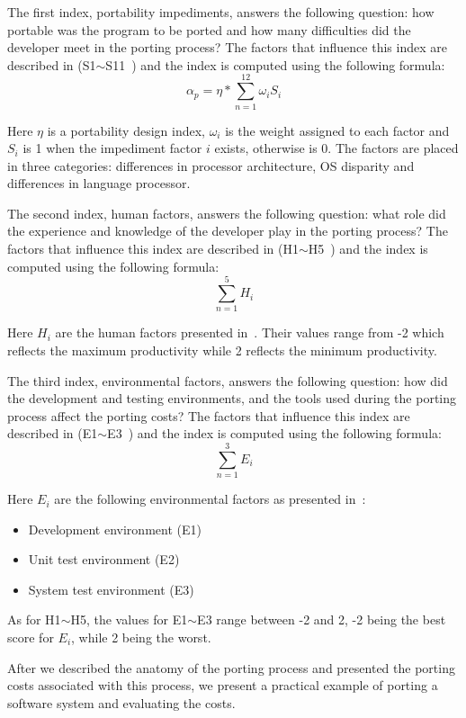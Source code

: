 The first index, portability impediments, answers the following question: how
portable was the program to be ported and how many difficulties did the
developer meet in the porting process? The factors that influence this index are
described in (S1$\sim$S11~\cite{hakuta}) and the index is computed using the
following formula: \[ \alpha_p = \eta * \sum_{n=1}^{12} \omega_i S_i \]

Here $\eta$ is a portability design index, $\omega_i$ is the weight assigned to
each factor and $S_i$ is 1 when the impediment factor $i$ exists, otherwise is
0. The factors are placed in three categories: differences in processor
architecture, OS disparity and differences in language processor.

The second index, human factors, answers the following question: what role did
the experience and knowledge of the developer play in the porting process? The
factors that influence this index are described in (H1$\sim$H5~\cite{hakuta}) and
the index is computed using the following formula: \[ \sum_{n=1}^{5} H_i \]

Here $H_i$ are the human factors presented in~\cite{hakuta}. Their values range
from -2 which reflects the maximum productivity while 2 reflects the minimum
productivity.

The third index, environmental factors, answers the following question: how did
the development and testing environments, and the tools used during the porting
process affect the porting costs? The factors that influence this index are
described in (E1$\sim$E3~\cite{hakuta}) and the index is computed using the
following formula: \[ \sum_{n=1}^{3} E_i \]

Here $E_i$ are the following environmental factors as presented in~\cite{hakuta}:
\begin{itemize}
    \item Development environment (E1)
    \item Unit test environment (E2)
    \item System test environment (E3)
\end{itemize}

As for H1$\sim$H5, the values for E1$\sim$E3 range between -2 and 2, -2 being the best
score for $E_i$, while 2 being the worst.

After we described the anatomy of the porting process and presented the porting
costs associated with this process, we present a practical example of porting a
software system and evaluating the costs.
